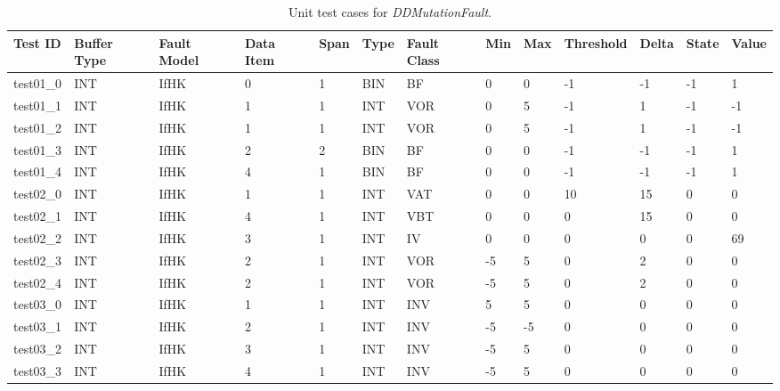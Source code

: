 
\setlength\LTleft{0pt}
\setlength\LTright{0pt}
\scriptsize

\begin{longtable}{|l|l|l|p{0.5cm}|p{0.5cm}|l|p{0.5cm}|p{0.5cm}|p{0.5cm}|l|l|p{0.5cm}|l|}

\caption{Unit test cases for \emph{DDMutationFault}.}
\label{table:matrix_FAULT} \\

\hline
\textbf{Test ID} & \textbf{Buffer Type} & \textbf{Fault Model} & \textbf{Data Item} & \textbf{Span} & \textbf{Type} & \textbf{Fault Class} & \textbf{Min} & \textbf{Max} & \textbf{Threshold} & \textbf{Delta} & \textbf{State} & \textbf{Value}\\
\hline
test01\_0 & INT & IfHK & 0 & 1 & BIN & BF & 0 & 0 & -1 & -1 & -1 & 1 \\
test01\_1 & INT & IfHK & 1 & 1 & INT & VOR & 0 & 5 & -1 & 1 & -1 & -1 \\
test01\_2 & INT & IfHK & 1 & 1 & INT & VOR & 0 & 5 & -1 & 1 & -1 & -1 \\
test01\_3 & INT & IfHK & 2 & 2 & BIN & BF & 0 & 0 & -1 & -1 & -1 & 1 \\
test01\_4 & INT & IfHK & 4 & 1 & BIN & BF & 0 & 0 & -1 & -1 & -1 & 1 \\
test02\_0 & INT & IfHK & 1 & 1 & INT & VAT & 0 & 0 & 10 & 15 & 0 & 0 \\
test02\_1 & INT & IfHK & 4 & 1 & INT & VBT & 0 & 0 & 0 & 15 & 0 & 0 \\
test02\_2 & INT & IfHK & 3 & 1 & INT & IV & 0 & 0 & 0 & 0 & 0 & 69 \\
test02\_3 & INT & IfHK & 2 & 1 & INT & VOR & -5 & 5 & 0 & 2 & 0 & 0 \\
test02\_4 & INT & IfHK & 2 & 1 & INT & VOR & -5 & 5 & 0 & 2 & 0 & 0 \\
test03\_0 & INT & IfHK & 1 & 1 & INT & INV & 5 & 5 & 0 & 0 & 0 & 0 \\
test03\_1 & INT & IfHK & 2 & 1 & INT & INV & -5 & -5 & 0 & 0 & 0 & 0 \\
test03\_2 & INT & IfHK & 3 & 1 & INT & INV & -5 & 5 & 0 & 0 & 0 & 0 \\
test03\_3 & INT & IfHK & 4 & 1 & INT & INV & -5 & 5 & 0 & 0 & 0 & 0 \\

\end{longtable}
